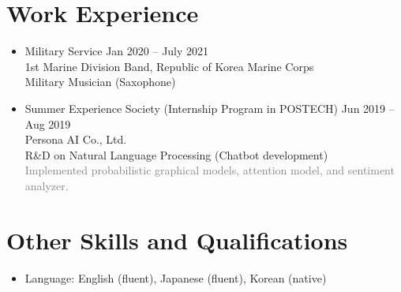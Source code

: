 \documentclass[11pt,a4paper]{article}
\begin{document}
\section*{Work Experience}
\begin{itemize}
\item
	Military Service
	\hfill{\small Jan 2020 -- July 2021}\\
	1st Marine Division Band, Republic of Korea Marine Corps\\
	Military Musician (Saxophone)
\item
	Summer Experience Society (Internship Program in POSTECH)
	\hfill{\small Jun 2019 -- Aug 2019}\\
	Persona AI Co., Ltd.\\
	R\&D on Natural Language Processing (Chatbot development)\\
	\textcolor{gray}{Implemented probabilistic graphical models, attention model, and sentiment analyzer.}
\end{itemize}





\section*{Other Skills and Qualifications}
\begin{itemize}
\item Language: English (fluent), Japanese (fluent), Korean (native)
\end{itemize}
	
\end{document}
